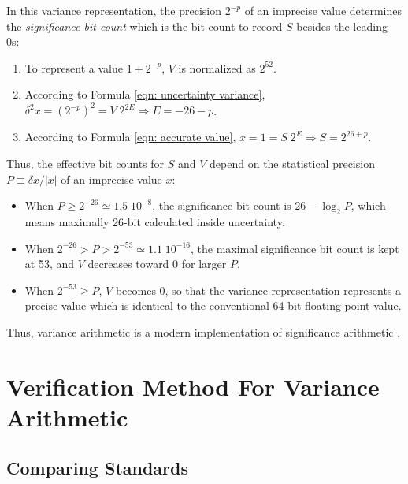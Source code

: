 \documentclass[twoside]{article}
\numberwithin{equation}{section}
\begin{document}
In this variance representation, the precision $2^{-p}$ of an imprecise value determines the \emph{significance bit count} which is the bit count to record $S$ besides the leading 0s:
\begin{enumerate}
\item To represent a value $1 \pm 2^{-p}$, $V$ is normalized as $2^{52}$.

\item According to Formula \eqref{eqn: uncertainty variance}, $\delta^2 x = (2^{-p})^2 = V \; 2^{2E} \Rightarrow E = -26 - p$.

\item According to Formula \eqref{eqn: accurate value}, $ x = 1 = S \; 2^E \Rightarrow S = 2^{26 + p}$.  
\end{enumerate}
Thus, the effective bit counts for $S$ and $V$ depend on the statistical precision $P \equiv \delta x / |x|$ of an imprecise value $x$:
\begin{itemize}
\item When $P \geq 2^{-26} \simeq 1.5\;10^{-8}$, the significance bit count is $26 - \log_{2} P$, which means maximally 26-bit calculated inside uncertainty.

\item When $2^{-26} > P > 2^{-53} \simeq 1.1\;10^{-16}$, the maximal significance bit count is kept at 53, and $V$ decreases toward 0 for larger $P$.

\item When $2^{-53} \geq P$, $V$ becomes 0, so that the variance representation represents a precise value which is identical to the conventional 64-bit floating-point value.
\end{itemize}
Thus, variance arithmetic is a modern implementation of significance arithmetic \cite{Significance_Arithmetic} \cite{Digital_Significance_Arithmetic} \cite{Unnormalized_Arithmetic}.


\clearpage
\section{Verification Method For Variance Arithmetic}
\label{sec: validation}

\subsection{Comparing Standards}
\end{document}
